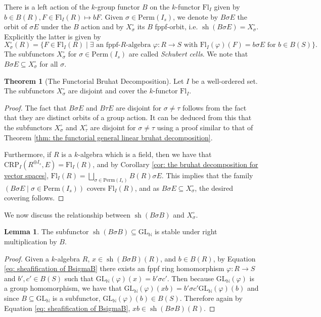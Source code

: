 \documentclass[oneside,11pt]{amsart}
\newcommand{\nn}{\ensuremath{\mathbb{N}}}
\newcommand{\CRP}{\ensuremath{\text{CRP}}}
\newcommand{\GL}{\ensuremath{\text{GL}}}
\newcommand{\Fl}{\ensuremath{\text{Fl}}}
\newcommand{\Perm}{\ensuremath{\text{Perm}}}
\newcommand{\sh}{\operatorname{sh}}
\theoremstyle{definition}
\newtheorem{proof techniques}{Proof Techniques}
\newtheorem{lemma}{Lemma}
\newtheorem{theorem}{Theorem}
\begin{document}
There is a left action of the $k$-group functor $B$ on the $k$-functor $\Fl_I$ given by $b \in B(R), F \in \Fl_I(R) \mapsto bF$. Given $\sigma \in \Perm(I_s)$, we denote by $B \sigma E$ the orbit of $\sigma E$ under the $B$ action and by $X^\circ_\sigma$ its $B$ fppf-orbit, i.e. $\sh(B \sigma E) = X_\sigma^\circ$. Explicitly the latter is given by 
\begin{equation*}
X_\sigma^\circ(R) = \{ F \in \Fl_{I}(R) \mid \exists \text{ an fppf-$R$-algebra } \varphi : R \to S \text{ with } \Fl_{I}(\varphi)(F) = b \sigma E \text{ for } b \in B(S) \}. 
\end{equation*}
The subfunctors $X^\circ_\sigma$ for $\sigma \in \Perm(I_s)$ are called \emph{Schubert cells}. We note that $B \sigma E \subseteq X^\circ_\sigma$ for all $\sigma$. 


\begin{theorem}[The Functorial Bruhat Decomposition]
Let $I$ be a well-ordered set. The subfunctors $X^\circ_\sigma$ are disjoint and cover the $k$-functor $\Fl_I$. 
\end{theorem}

\begin{proof}
The fact that $B \sigma E$ and $B \tau E$ are disjoint for $\sigma \neq \tau$ follows from the fact that they are distinct orbits of a group action. It can be deduced from this that the subfunctors $X^\circ_\sigma$ and $X^\circ_\tau$ are disjoint for $\sigma \neq \tau$ using a proof similar to that of Theorem \ref{thm: the functorial general linear bruhat decomposition}. 

Furthermore, if $R$ is a $k$-algebra which is a field, then we have that $\CRP_I(R^{\oplus I_s} , E) = \Fl_I(R)$, and by Corollary \ref{cor: the bruhat decomposition for vector spaces}, $\Fl_I(R) = \bigsqcup_{\sigma \in \Perm(I_s)} B(R) \sigma E$. This implies that the family $(B \sigma E \mid \sigma \in \Perm(I_s))$ covers $\Fl_I(R)$, and as $B \sigma E \subseteq X_\sigma^\circ$, the desired covering follows. 
\end{proof}



We now discuss the relationship between $\sh(B \sigma B)$ and $X^\circ_\sigma$. 

\begin{lemma}\label{lem: sheafification of BsigmaB is B stable}
The subfunctor $\sh(B \sigma B) \subseteq \GL_\nn$ is stable under right multiplication by $B$. 
\end{lemma}

\begin{proof}
Given a $k$-algebra $R$,  $x \in \sh(B \sigma B)(R)$, and $b \in B(R)$, by Equation \ref{eq: sheafification of BsigmaB} there exists an fppf ring homomorphism $\varphi : R \to S$ and $b' , c' \in B(S)$ such that $\GL_\nn(\varphi)(x) = b' \sigma c'$. Then because $\GL_\nn(\varphi)$ is a group homomorphism, we have that $\GL_\nn(\varphi)(x b) = b' \sigma c' \GL_\nn(\varphi)(b)$ and since $B \subseteq \GL_\nn$ is a subfunctor, $\GL_\nn(\varphi)(b) \in B(S)$. Therefore again by Equation \ref{eq: sheafification of BsigmaB}, $x b \in \sh(B \sigma B)(R)$.
\end{proof} 
\end{document}
